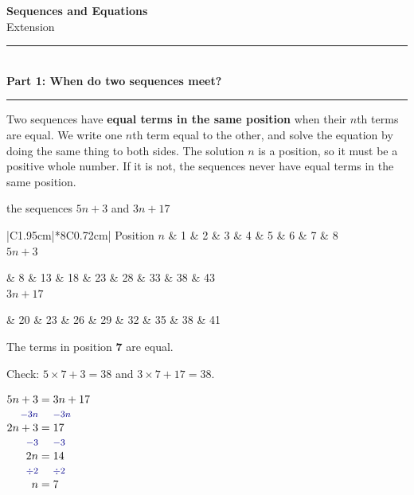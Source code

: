 \documentclass[11pt,a4paper]{article}
\makeatletter
\newcommand{\rowstrut}{\rule[-1.9mm]{0pt}{5.8mm}}
\newcommand{\parttitle}[2]{%
  \vspace{1pt}
  {\color{blue!45!black}\rule{\linewidth}{1pt}}\\[1pt]
  {\large\bfseries Part #1: #2}\\[-6pt]
  {\color{blue!45!black}\rule{\linewidth}{0.4pt}}
  \par\vspace{-5pt}}
\newenvironment{working}
  {\(\renewcommand{\arraystretch}{1.06}\begin{array}{@{}r@{\;}c@{\;}l@{}}}
  {\end{array}\)}
\newcommand{\opstyle}[1]{\text{\footnotesize\color{blue!55!black}$#1$}}
\newcommand{\bsop}[1]{\opstyle{#1} & & \opstyle{#1}\\}
\newcommand{\meetlayout}[3]{%
  \begin{minipage}[c]{0.62\linewidth}\raggedright #1\par\medskip #3\end{minipage}\hfill
  \begin{minipage}[c]{0.36\linewidth}\centering #2\end{minipage}}
\newcommand{\hl}[1]{\cellcolor{orange!18}#1}
\newcommand{\termtable}[5][1 & 2 & 3 & 4 & 5 & 6 & 7 & 8]{%
  {\setlength{\tabcolsep}{2pt}%
  \begin{tabular}{|C{1.95cm}|*{8}{C{0.72cm}|}}\hline
  {\small Position $n$} & #1\\\hline
  #2\rowstrut & #3\\\hline
  #4\rowstrut & #5\\\hline
  \end{tabular}}}
\makeatother
\begin{document}
\begin{center}
  {\Large\bfseries Sequences and Equations}\\[1pt]
  {\small Extension}
\end{center}
\vspace{-10pt}

\parttitle{1}{When do two sequences meet?}

\begin{keyidea}
Two sequences have \textbf{equal terms in the same position} when their $n$th
terms are equal. We write one $n$th term equal to the other, and solve the equation
by doing the same thing to both sides. The solution $n$ is a position, so it must be
a positive whole number. If it is not, the sequences never have equal terms in the
same position.
\end{keyidea}

\begin{wex}{the sequences $5n+3$ and $3n+17$}
\meetlayout
  {\termtable[1 & 2 & 3 & 4 & 5 & 6 & \hl{7} & 8]
    {$5n+3$}{8 & 13 & 18 & 23 & 28 & 33 & \hl{38} & 43}
    {$3n+17$}{20 & 23 & 26 & 29 & 32 & 35 & \hl{38} & 41}}
  {\begin{working}
     5n+3 & = & 3n+17\\ \bsop{-3n}
     2n+3 & = & 17\\ \bsop{-3}
     2n & = & 14\\ \bsop{\div 2}
     n & = & 7
   \end{working}}
  {The terms in position \textbf{7} are equal.\par\smallskip
   Check: $5\times7+3=38$ and $3\times7+17=38$.}
\end{wex}
\end{document}
